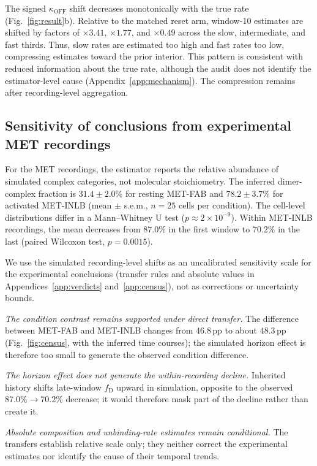 \documentclass{article}
\newcommand{\fD}{f_{\mathrm{D}}}
\newcommand{\koff}{\kappa_{\mathrm{OFF}}}
\newcommand{\pp}{\,\mathrm{pp}}
\begin{document}
The signed $\koff$ shift decreases monotonically with the true rate
(Fig.~\ref{fig:result}b). Relative to the matched reset arm, window-10
estimates are shifted by factors of $\times3.41$, $\times1.77$, and
$\times0.49$ across the slow, intermediate, and fast thirds. Thus, slow
rates are estimated too high and fast rates too low, compressing estimates
toward the prior interior. This pattern is consistent with reduced
information about the true rate, although the audit does not identify the
estimator-level cause (Appendix~\ref{app:mechanism}). The compression remains after recording-level
aggregation.

\subsection{Sensitivity of conclusions from experimental MET recordings}
\label{sec:census}
\label{sec:claims}

For the MET recordings, the estimator reports the relative abundance of
simulated complex categories, not molecular stoichiometry. The inferred
dimer-complex fraction is $31.4\pm2.0\%$ for resting MET-FAB and
$78.2\pm3.7\%$ for activated MET-INLB (mean $\pm$ s.e.m.,
$n=25$ cells per condition). The cell-level distributions differ in a
Mann--Whitney U test ($p\approx2\times10^{-9}$). Within MET-INLB recordings,
the mean decreases from $87.0\%$ in the first window to $70.2\%$ in the last
(paired Wilcoxon test, $p=0.0015$).

We use the simulated recording-level shifts as an uncalibrated sensitivity
scale for the experimental conclusions (transfer rules and absolute values in
Appendices~\ref{app:verdicts} and~\ref{app:census}), not as corrections or
uncertainty bounds.

\emph{The condition contrast remains supported under direct transfer.}
The difference between MET-FAB and MET-INLB changes from $46.8\pp$ to about
$48.3\pp$ (Fig.~\ref{fig:census}, with the inferred time courses); the
simulated horizon effect is therefore too small to generate the observed
condition difference.

\emph{The horizon effect does not generate the within-recording decline.}
Inherited history shifts late-window $\fD$ upward in simulation, opposite to
the observed $87.0\%\rightarrow70.2\%$ decrease; it would therefore mask part
of the decline rather than create it.

\emph{Absolute composition and unbinding-rate estimates remain conditional.}
The transfers establish relative scale only; they neither correct the
experimental estimates nor identify the cause of their temporal trends.
\end{document}
